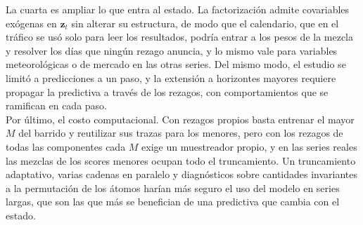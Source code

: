 La cuarta es ampliar lo que entra al estado. La factorización admite covariables exógenas en $\mathbf{z}_t$ sin alterar su estructura, de modo que el calendario, que en el tráfico se usó solo para leer los resultados, podría entrar a los pesos de la mezcla y resolver los días que ningún rezago anuncia, y lo mismo vale para variables meteorológicas o de mercado en las otras series. Del mismo modo, el estudio se limitó a predicciones a un paso, y la extensión a horizontes mayores requiere propagar la predictiva a través de los rezagos, con comportamientos que se ramifican en cada paso.\\

Por último, el costo computacional. Con rezagos propios basta entrenar el mayor $M$ del barrido y reutilizar sus trazas para los menores, pero con los rezagos de todas las componentes cada $M$ exige un muestreador propio, y en las series reales las mezclas de los scores menores ocupan todo el truncamiento. Un truncamiento adaptativo, varias cadenas en paralelo y diagnósticos sobre cantidades invariantes a la permutación de los átomos harían más seguro el uso del modelo en series largas, que son las que más se benefician de una predictiva que cambia con el estado.
